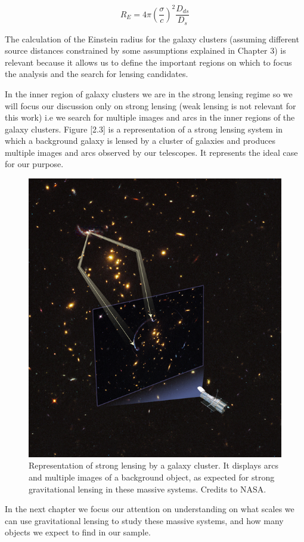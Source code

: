 \begin{equation}
R_E=4\pi\left(\frac{\sigma}{c}\right)^{2}\frac{D_{ds}}{D_{s}}
\end{equation}

The calculation of the Einstein radius for the galaxy clusters (assuming different source distances constrained by some assumptions explained in Chapter 3) is relevant because it allows us to define the important regions on which to focus the analysis and the search for lensing candidates.

In the inner region of galaxy clusters we are in the strong lensing regime so we will focus our discussion only on strong lensing (weak lensing is not relevant for this work) i.e we search for multiple images and arcs in the inner regions of the galaxy clusters. Figure [2.3] is a representation of a strong lensing system in which a background galaxy is lensed by a cluster of galaxies and produces multiple images and arcs observed by our telescopes. It represents the ideal case for our purpose. 

\begin{figure}[H]
\centering
\includegraphics[width=12cm]{images/lensing.jpg}
\caption[Strong Lensing representation]{Representation of strong lensing by a galaxy cluster. It displays arcs and multiple images of a background object, as expected for strong gravitational lensing in these massive systems. Credits to NASA.}
\end{figure}

In the next chapter we focus our attention on understanding on what scales we can use gravitational lensing to study these massive systems, and how many objects we expect to find in our sample.